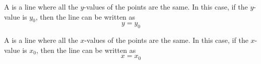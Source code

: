 \documentclass[nooutcomes]{ximera}
\begin{document}
\begin{definition}
A  is a line where all the $y$-values of the points are the same.  In this case, if the $y$-value is $y_0$, then the line can be written as 
$$y=y_0$$
\begin{center}
\end{center}
\end{definition}



\begin{definition}
A  is a line where all the $x$-values of the points are the same.  In this case, if the $x$-value is $x_0$, then the line can be written as 
$$x=x_0$$
\begin{center}
\end{center}
\end{definition}
\end{document}
